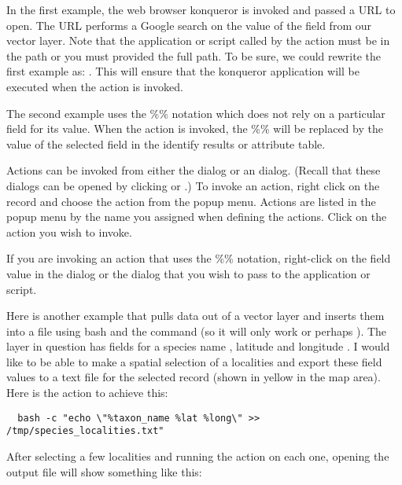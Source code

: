 In the first example, the web browser konqueror is invoked and passed a URL to
open. The URL performs a Google search on the value of the  field
from our vector layer. Note that the application or script called by the
action must be in the path or you must provided the full path. To be sure, we could
rewrite the first example as: . This will ensure that the konqueror
application will be executed when the action is invoked.

The second example uses the \%\% notation which does not rely on a particular
field for its value. When the action is invoked, the \%\% will be replaced by
the value of the selected field in the identify results or attribute table.

\label{label_usingactions}

Actions can be invoked from either the  dialog or an
 dialog. (Recall that these dialogs can be opened by
clicking  or
.) To invoke an action,
right click on the record and choose the action from the popup menu. Actions
are listed in the popup menu by the name you assigned when defining the
actions. Click on the action you wish to invoke.

If you are invoking an action that uses the \%\% notation, right-click on the
field value in the  dialog or the
 dialog that you wish to pass to the application or script.

Here is another example that pulls data out of a vector layer and inserts them
into a file using bash and the  command (so it will only work
\nix or perhaps \osx). The layer in question has fields for a species name
, latitude  and longitude
. I would like to be able to
make a spatial selection of a localities and export these field values to a
text file for the selected record (shown in yellow in the \qg map area). Here is
the action to achieve this:

\begin{verbatim}
  bash -c "echo \"%taxon_name %lat %long\" >> /tmp/species_localities.txt"
\end{verbatim} 

After selecting a few localities and running the action on each one, opening
the output file will show something like this:

